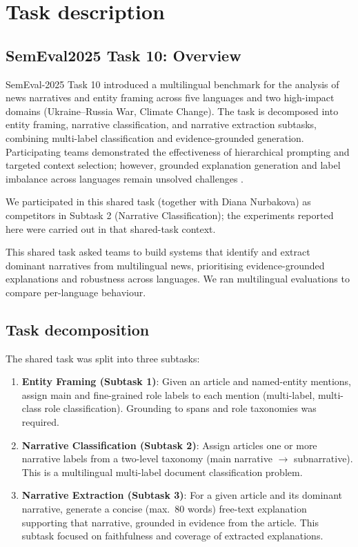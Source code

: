 \section{Task description}
\label{sec:semeval25-task10}

\subsection{SemEval2025 Task 10: Overview}
SemEval-2025 Task 10 introduced a multilingual benchmark for the analysis of news narratives and entity framing across five languages and two high-impact domains (Ukraine–Russia War, Climate Change). The task is decomposed into entity framing, narrative classification, and narrative extraction subtasks, combining multi-label classification and evidence-grounded generation. Participating teams demonstrated the effectiveness of hierarchical prompting and targeted context selection; however, grounded explanation generation and label imbalance across languages remain unsolved challenges \cite{Piskorski2025, Fane2025, Singh2025, Fenu2025}.

We participated in this shared task (together with Diana Nurbakova) as competitors in Subtask 2 (Narrative Classification); the experiments reported here were carried out in that shared-task context.

This shared task asked teams to build systems that identify and extract dominant narratives from multilingual news, prioritising evidence-grounded explanations and robustness across languages. We ran multilingual evaluations to compare per-language behaviour.

\subsection{Task decomposition}
The shared task was split into three subtasks:
\begin{enumerate}
  \item \textbf{Entity Framing (Subtask 1)}: Given an article and named-entity mentions, assign main and fine-grained role labels to each mention (multi-label, multi-class role classification). Grounding to spans and role taxonomies was required. \cite{Piskorski2025}
  \item \textbf{Narrative Classification (Subtask 2)}: Assign articles one or more narrative labels from a two-level taxonomy (main narrative $\rightarrow$ subnarrative). This is a multilingual multi-label document classification problem. \cite{Piskorski2025}
  \item \textbf{Narrative Extraction (Subtask 3)}: For a given article and its dominant narrative, generate a concise (max.~80 words) free-text explanation supporting that narrative, grounded in evidence from the article. This subtask focused on faithfulness and coverage of extracted explanations. \cite{Piskorski2025}
\end{enumerate}

